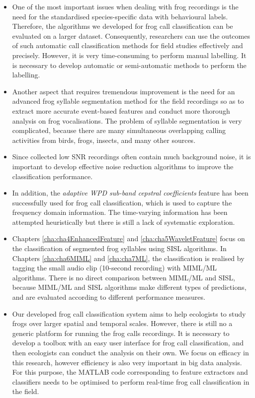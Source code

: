 \begin{itemize}
\item  One of the most important issues when dealing with frog recordings is the need for the standardised species-specific data with behavioural labels. Therefore, the algorithms we developed for frog call classification can be evaluated on a larger dataset. Consequently, researchers can use the outcomes of such automatic call classification methods for field studies effectively and precisely. However, it is very time-consuming to perform manual labelling. It is necessary to develop automatic or semi-automatic methods to perform the labelling.

\item  Another aspect that requires tremendous improvement is the need for an advanced frog syllable segmentation method for the field recordings so as to extract more accurate event-based features and conduct more thorough analysis on frog vocalisations. The problem of syllable segmentation is very complicated, because there are many simultaneous overlapping calling activities from birds, frogs, insects, and many other sources. 

\item Since collected low SNR recordings often contain much background noise, it is important to develop effective noise reduction algorithms to improve the classification performance.


\item In addition, the \textit{adaptive WPD sub-band cepstral coefficients} feature has been successfully used for frog call classification, which is used to capture the frequency domain information. The time-varying information has been attempted heuristically but there is still a lack of systematic exploration. 



\item Chapters \ref{cha:cha4EnhancedFeature} and \ref{cha:cha5WaveletFeature} focus on the classification of segmented frog syllables using SISL algorithms. In Chapters \ref{cha:cha6MIML} and \ref{cha:cha7ML}, the classification is realised by tagging the small audio clip (10-second recording) with MIML/ML algorithms. There is no direct comparison between MIML/ML and SISL, because MIML/ML and SISL algorithms make different types of predictions, and are evaluated according to different performance measures.



\item Our developed frog call classification system aims to help ecologists to study frogs over larger spatial and temporal scales. However, there is still no a generic platform for running the frog calls recordings. It is necessary to develop a toolbox with an easy user interface for frog call classification, and then ecologists can conduct the analysis on their own. 
We focus on efficacy in this research, however efficiency is also very important in big data analysis. For this purpose, the MATLAB code corresponding to feature extractors and classifiers needs to be optimised to perform real-time frog call classification in the field.


\end{itemize}










